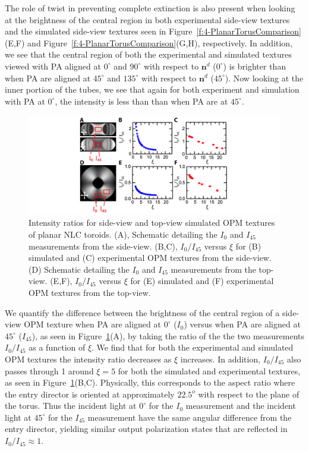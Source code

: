 The role of twist in preventing complete extinction is also present when looking at the brightness of the central region in both experimental side-view textures and the simulated side-view textures seen in Figure~\ref{f:4-PlanarTorusComparison}(E,F) and Figure~\ref{f:4-PlanarTorusComparison}(G,H), respectively.
In addition, we see that the central region of both the experimental and simulated textures viewed with PA aligned at $0^{\circ}$ and $90^{\circ}$ with respect to $\mathbf{n}^d$ ($0^{\circ}$) is brighter than when PA are aligned at $45^{\circ}$ and $135^{\circ}$ with respect to $\mathbf{n}^d$ ($45^{\circ}$).
Now looking at the inner portion of the tubes, we see that again for both experiment and simulation with PA at $0^{\circ}$, the intensity is less than than when PA are at $45^{\circ}$.
\begin{figure}
\centering
\includegraphics{figures/C4/Ch4-Figs_PlanarSimIntRat.png}
\caption{Intensity ratios for side-view and top-view simulated OPM textures of planar NLC toroids.
(A), Schematic detailing the $I_0$ and $I_{45}$ measurements from the side-view.
(B,C), $I_0/I_{45}$ versus $\xi$ for (B) simulated and (C) experimental OPM textures from the side-view.
(D) Schematic detailing the $I_0$ and $I_{45}$ measurements from the top-view.
(E,F), $I_0/I_{45}$ versus $\xi$ for (E) simulated and (F) experimental OPM textures from the top-view. }\label{f:4-PlanarIntRatio}
\end{figure}

We quantify the difference between the brightness of the central region of a side-view OPM texture when PA are aligned at $0^{\circ}$ ($I_0$) versus when PA are aligned at $45^{\circ}$ ($I_{45}$), as seen in Figure~\ref{f:4-PlanarIntRatio}(A), by taking the ratio of the the two measurements $I_0/I_{45}$ as a function of $\xi$.
We find that for both the experimental and simulated OPM textures the intensity ratio decreases as $\xi$ increases. In addition, $I_0/I_{45}$ also passes through 1 around $\xi = 5$ for both the simulated and experimental textures, as seen in Figure~\ref{f:4-PlanarIntRatio}(B,C).
Physically, this corresponds to the aspect ratio where the entry director is oriented at approximately $22.5^o$ with respect to the plane of the torus.
Thus the incident light at $0^{\circ}$ for the $I_0$ measurement and the incident light at $45^{\circ}$ for the $I_{45}$ measurement have the same angular difference from the entry director, yielding similar output polarization states that are reflected in $I_0/I_{45} \approx 1$.


